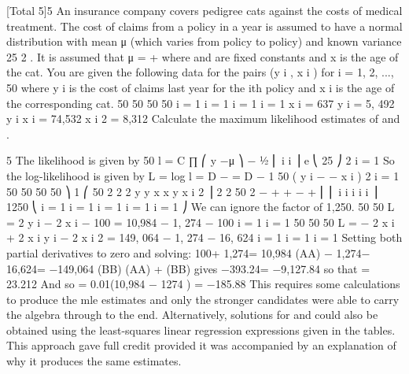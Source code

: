 \documentclass[a4paper,12pt]{article}
\begin{document}
[Total 5]5
An insurance company covers pedigree cats against the costs of medical treatment.
The cost of claims from a policy in a year is assumed to have a normal distribution
with mean μ (which varies from policy to policy) and known variance 25 2 . It is
assumed that μ = \alpha  + \betax where \alpha  and \beta are fixed constants and x is the age of the cat.
You are given the following data for the pairs (y i , x i ) for i = 1, 2, ..., 50 where y i is the
cost of claims last year for the ith policy and x i is the age of the corresponding cat.
50 50 50 50
i = 1 i = 1 i = 1 i = 1
\sum  x i = 637 \sum  y i = 5, 492 \sum  y i x i = 74,532 \sum  x i 2 = 8,312
Calculate the maximum likelihood estimates of \alpha  and \beta.



5
The likelihood is given by
50
l = C \times  ∏
⎛ y −μ ⎞
− 1⁄2 ⎜ i i ⎟
e ⎝ 25 ⎠
2
i = 1
So the log-likelihood is given by
L = log l = D −
= D −
1 50
( y i − \alpha  − \beta x i ) 2
 i = 1
50
50
50
50
⎞
1 ⎛ 50 2
2
2
y
y
x
x
y
x i 2 ⎟
2
2
50
2
−
\alpha 
+
\alpha \beta
+
\alpha 
−
\beta
+
\beta
⎜ ⎜ \sum  i
\sum 
\sum 
\sum 
\sum 
i
i
i i
⎟
1250 ⎝ i = 1
i = 1
i = 1
i = 1
i = 1
⎠
We can ignore the factor of 1,250.
50
50
\frac{\partial}{\partial} L
= 2 \sum  y i − 2 \beta \sum  x i − 100 \alpha  = 10,984 − 1, 274 \beta − 100 \alpha 
\frac{\partial}{\partial}\alpha 
i = 1
i = 1
50
50
50
\frac{\partial}{\partial} L
= − 2 \alpha  \sum  x i + 2 \sum  x i y i − 2 \beta \sum  x i 2 = 149, 064 − 1, 274 \alpha  − 16, 624 \beta
\frac{\partial}{\partial}\beta
i = 1
i = 1
i = 1
Setting both partial derivatives to zero and solving:
100\alpha  + 1,274\beta = 10,984
(AA)
− 1,274\alpha  − 16,624\beta = −149,064 (BB)
(AA)  + (BB) gives −393.24\beta = −9,127.84 so that \beta = 23.212
And so \alpha  = 0.01(10,984 − 1274 ) = −185.88
This requires some calculations to produce the mle estimates and only the stronger
candidates were able to carry the algebra through to the end. Alternatively, solutions for
and could also be obtained using the least-squares linear regression expressions given in
the tables. This approach gave full credit provided it was accompanied by an explanation of
why it produces the same estimates.
\end{document}
